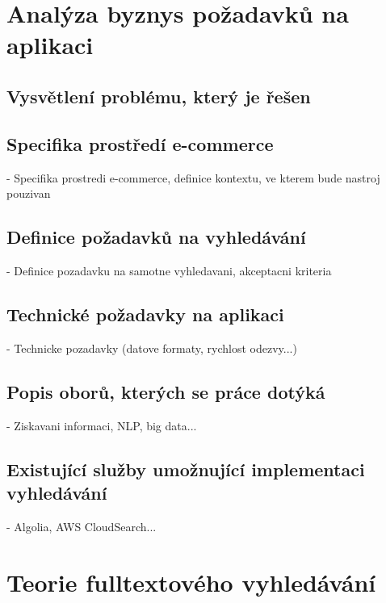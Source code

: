 \documentclass[FM,DP]{tulthesis}
\begin{document}


\chapter{Analýza byznys požadavků na aplikaci}

\section{Vysvětlení problému, který je řešen}

\section{Specifika prostředí e-commerce}
- Specifika prostredi e-commerce, definice kontextu, ve kterem bude nastroj pouzivan

\section{Definice požadavků na vyhledávání}
- Definice pozadavku na samotne vyhledavani, akceptacni kriteria

\section{Technické požadavky na aplikaci}
- Technicke pozadavky (datove formaty, rychlost odezvy...)

\section{Popis oborů, kterých se práce dotýká}
- Ziskavani informaci, NLP, big data...

\section{Existující služby umožnující implementaci vyhledávání}
- Algolia, AWS CloudSearch...


\chapter{Teorie fulltextového vyhledávání}
\end{document}
